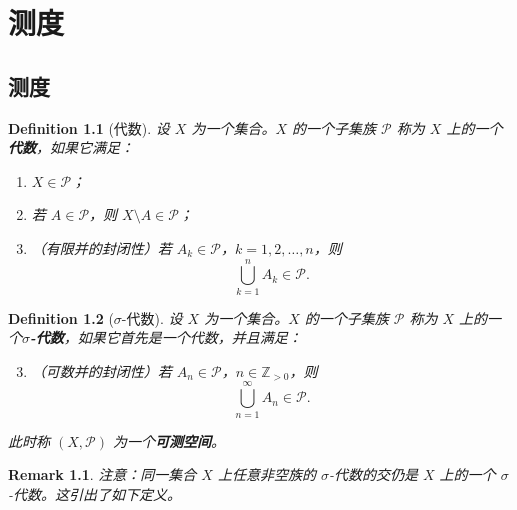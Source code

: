 \documentclass[12pt,letterpaper,twoside,openright]{ctexbook}
\theoremstyle{bluehead}
\theoremstyle{olivehead}
\newtheorem{definition}{Definition}
\theoremstyle{orangehead}
\theoremstyle{redremark}
\newtheorem*{remark}{Remark}
\begin{document}
\tableofcontents

\chapter{测度}

\section{测度}

\begin{definition}[代数]
设 $X$ 为一个集合。$X$ 的一个子集族 $\mathcal{P}$ 称为 $X$ 上的一个\textbf{代数}，如果它满足：
\begin{enumerate}
  \item $X \in \mathcal{P}$；
  \item 若 $A \in \mathcal{P}$，则 $X \setminus A \in \mathcal{P}$；
  \item （有限并的封闭性）若 $A_k \in \mathcal{P}$，$k=1,2,\ldots,n$，则
  \[
    \bigcup_{k=1}^{n} A_k \in \mathcal{P}.
  \]
\end{enumerate}
\end{definition}

\begin{definition}[$\sigma$-代数]
设 $X$ 为一个集合。$X$ 的一个子集族 $\mathcal{P}$ 称为 $X$ 上的一个\textbf{$\sigma$-代数}，如果它首先是一个代数，并且满足：
\begin{enumerate}
  \setcounter{enumi}{2}
  \item （可数并的封闭性）若 $A_n \in \mathcal{P}$，$n \in \mathbb{Z}_{>0}$，则
  \[
    \bigcup_{n=1}^{\infty} A_n \in \mathcal{P}.
  \]
\end{enumerate}
此时称 $(X,\mathcal{P})$ 为一个\textbf{可测空间}。
\end{definition}
\begin{remark}
注意：同一集合 $X$ 上任意非空族的 $\sigma$-代数的交仍是 $X$ 上的一个 $\sigma$-代数。这引出了如下定义。
\end{remark}
\end{document}
